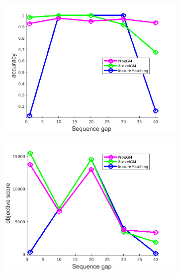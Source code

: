 \begin{figure}[h] 
	\begin{subfigure}[b]{0.3\textwidth}
		\centering
		\includegraphics[scale=0.25]{"chapter3/fig/ImageTrafo/anchor_descr/using_cpd_afftrafo/performance/accuracy"}  
	\end{subfigure}%
	\begin{subfigure}[b]{0.3\textwidth}
		\centering
		\includegraphics[scale=0.25]{"chapter3/fig/ImageTrafo/anchor_descr/using_cpd_afftrafo/performance/score"}  
	\end{subfigure} 
	\begin{subfigure}[b]{0.3\textwidth}
		\centering

\end{subfigure}
\end{figure}
